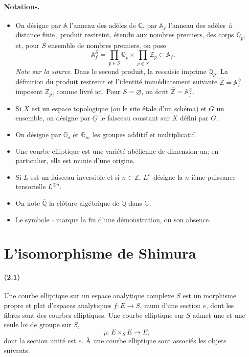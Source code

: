 \documentclass[10pt]{article}
\newcommand{\A}{\mathbb A}
\newcommand{\Af}{\mathbb A_f}
\newcommand{\C}{\mathbb C}
\newcommand{\Q}{\mathbb Q}
\newcommand{\Z}{\mathbb Z}
\newcommand{\bZ}{\widehat{\mathbb Z}}
\newcommand{\Ga}{\mathbb G_a}
\newcommand{\Gm}{\mathbb G_m}
\newcommand{\frquote}[1]{\guillemotleft{}\,#1\,\guillemotright{}}
\begin{document}
\paragraph{Notations.}
\begin{itemize}
\item On désigne par $\A$ l'anneau des adèles de $\Q$, par $\Af$ l'anneau des adèles
\frquote{à distance finie}, produit restreint, étendu aux nombres premiers, des corps
$\Q_p$, et, pour $S$ ensemble de nombres premiers, on pose
\[
\Af^S=\prod_{p\in S}\Q_p\times\prod_{p\notin S}\Z_p\subset \Af .
\]
\noindent\emph{Note sur la source.} Dans le second produit, la ressaisie imprime $\Q_p$.
La définition du produit restreint et l'identité immédiatement suivante
$\widehat{\Z}=\Af^\varnothing$ imposent $\Z_p$, comme livré ici.
Pour $S=\varnothing$, on écrit $\bZ=\Af^\varnothing$.
\item Si $X$ est un espace topologique (ou le site étale d'un schéma) et $G$ un ensemble,
on désigne par $\underline{G}$ le faisceau constant sur $X$ défini par $G$.
\item On désigne par $\Ga$ et $\Gm$ les groupes additif et multiplicatif.
\item Une courbe elliptique est une variété abélienne de dimension un; en particulier, elle
est munie d'une origine.
\item Si $L$ est un faisceau inversible et si $n\in\Z$, $L^n$ désigne la $n$-ième puissance
tensorielle $L^{\otimes n}$.
\item On note $\overline{\Q}$ la clôture algébrique de $\Q$ dans $\C$.
\item Le symbole $\square$ marque la fin d'une démonstration, ou son absence.
\end{itemize}

\section{L'isomorphisme de Shimura}

\paragraph{(2.1)}
Une courbe elliptique sur un espace analytique complexe $S$ est un morphisme propre et
plat d'espaces analytiques $f:E\to S$, muni d'une section $e$, dont les fibres sont des
courbes elliptiques. Une courbe elliptique sur $S$ admet une et une seule loi de groupe sur
$S$,
\[
\mu:E\times_S E\to E,
\]
dont la section unité est $e$. À une courbe elliptique sont associés les objets suivants.
\end{document}
